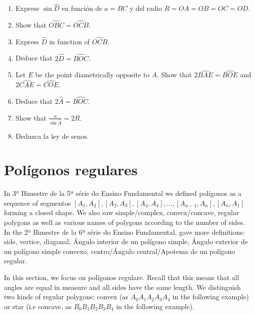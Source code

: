 \begin{enumerate}
\item Exprese $\sin \widehat{D}$ en función de $a = BC$ y del radio
  $R = OA = OB = OC = OD$.
\item Show that $\widehat{OBC} = \widehat{OCB}$.
\item Express $\widehat{D}$ in function of $\widehat{OCB}$.
\item Deduce that $2 \widehat{D} = \widehat{BOC}$.
\item Let $E$ be the point diametrically opposite to $A$.
  Show that $2 \widehat{BAE} = \widehat{BOE}$ and
  $2 \widehat{CAE} = \widehat{COE}$.
\item Deduce that $2 \widehat{A} = \widehat{BOC}$.
\item Show that $\frac{a}{\sin \widehat{A}} = 2R$.
\item Deduzca la ley de senos.
\end{enumerate}

\section{Polígonos regulares}

In 3º Bimestre de la 5ª série do Ensino Fundamental we defined polígonos
as a sequence of segmentos
${[A_1,A_2]}, {[A_2, A_3]}, {[A_3, A_4]},\ldots,
{[A_{n-1},A_n]}, {[A_{n},A_1]}$ forming a closed shape.
We also saw
simple/complex, convex/concave, regular polygons as well as various names of
polygons according to the number of sides.
In the 2º Bimestre de la 6ª série do Ensino Fundamental, gave more definitions:
side, vertice, diagonal, Ángulo interior de un polígono simple,
Ángulo exterior de un polígono simple convexo,
centro/Ángulo central/Apotema de un polígono regular.

In this section, we focus on polígonos regulare. Recall that this means that
all angles are equal in measure and all sides have the same length.
We distinguish two kinds of regular polygons: convex (as $A_0A_1A_2A_3A_4$
in the following example)
or star (i.e concave, as $B_0B_1B_2B_3B_4$ in the following example).

\begin{center}
\end{center}

